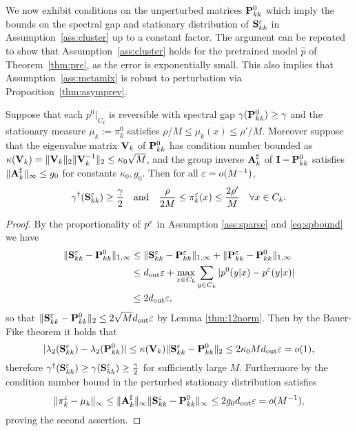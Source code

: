 We now exhibit conditions on the unperturbed matrices $\mathbf{P}_{kk}^0$ which imply the bounds on the spectral gap and stationary distribution of $\mathbf{S}_{kk}^\varepsilon$ in Assumption~\ref{ass:cluster} up to a constant factor. The argument can be repeated to show that Assumption~\ref{ass:cluster} holds for the pretrained model $\hat{p}$ of Theorem~\ref{thm:pre}, as the error is exponentially small. This also implies that Assumption~\ref{ass:metamix} is robust to perturbation via Proposition~\ref{thm:asymprev}.

\begin{prop}\label{thm:spectralgap}
Suppose that each $p^0|_{C_k}$ is reversible with spectral gap $\gamma(\mathbf{P}_{kk}^0)\ge\gamma$ and the stationary measure $\mu_k :=\pi_k^0$ satisfies $\rho/M\le \mu_k(x) \le \rho'/M$. Moreover suppose that the eigenvalue matrix $\mathbf{V}_k$ of $\mathbf{P}_{kk}^0$ has condition number bounded as $\kappa(\mathbf{V}_k) = \lVert\mathbf{V}_k\rVert_2\lVert\mathbf{V}_k^{-1}\rVert_2 \le \kappa_0\sqrt{M}$, and the group inverse $\mathbf{A}_k^\sharp$ of $\mathbf{I} - \mathbf{P}_{kk}^0$ satisfies $\lVert\mathbf{A}_k^\sharp\rVert_\infty \le g_0$ for constants $\kappa_0,g_0$. Then for all $\varepsilon=o(M^{-1})$,
\begin{equation*}
\gamma^\dagger(\mathbf{S}_{kk}^\varepsilon) \ge \frac{\gamma}{2} \quad\text{and}\quad \frac{\rho}{2M} \le\pi_k^\varepsilon(x) \le\frac{2\rho'}{M}\quad\forall x\in C_k.
\end{equation*}
\end{prop}

\begin{proof}
By the proportionality of $p^\varepsilon$ in Assumption \ref{ass:sparse} and \eqref{eq:spbound} we have
\begin{align*}
\lVert\mathbf{S}_{kk}^\varepsilon - \mathbf{P}_{kk}^0\rVert_{1,\infty} &\le \lVert\mathbf{S}_{kk}^\varepsilon - \mathbf{P}_{kk}^\varepsilon\rVert_{1,\infty} + \lVert\mathbf{P}_{kk}^\varepsilon - {\mathbf{P}_{kk}^0}\rVert_{1,\infty}\\
&\le d_{\operatorname{out}}\varepsilon + \max_{x\in C_k} \sum_{y\in C_k} |p^0(y|x) - p^\varepsilon(y|x)| \\
&\le 2d_{\operatorname{out}}\varepsilon,
\end{align*}
so that $\lVert\mathbf{S}_{kk}^\varepsilon - \mathbf{P}_{kk}^0\rVert_2 \le 2\sqrt{M}d_{\operatorname{out}}\varepsilon$ by Lemma \ref{thm:12norm}. Then by the Bauer-Fike theorem it holds that
\begin{equation*}
|\lambda_2(\mathbf{S}_{kk}^\varepsilon)- \lambda_2(\mathbf{P}_{kk}^0)| \le \kappa(\mathbf{V}_k)\lVert\mathbf{S}_{kk}^\varepsilon - \mathbf{P}_{kk}^0\rVert_2 \le 2\kappa_0 Md_{\operatorname{out}}\varepsilon = o(1),
\end{equation*}
therefore $\gamma^\dagger(\mathbf{S}_{kk}^\varepsilon) \ge \gamma(\mathbf{S}_{kk}^\varepsilon) \ge \frac{\gamma}{2}$ for sufficiently large $M$. Furthermore by the condition number bound in \citet{Meyer80} the perturbed stationary distribution satisfies
\begin{equation*}
\lVert\pi_k^\varepsilon - \mu_k\rVert_\infty \le \lVert\mathbf{A}_k^\sharp\rVert_\infty \lVert\mathbf{S}_{kk}^\varepsilon - \mathbf{P}_{kk}^0\rVert_\infty \le 2g_0 d_{\operatorname{out}}\varepsilon = o(M^{-1}),
\end{equation*}
proving the second assertion.
\end{proof}

